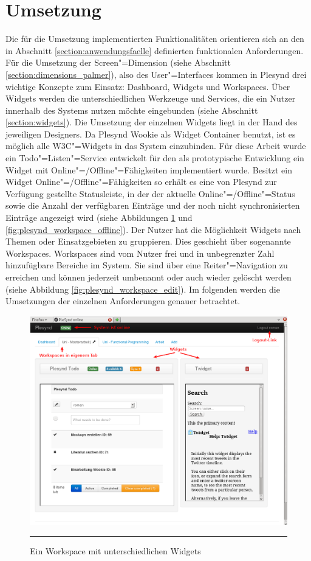 \section{Umsetzung}\label{section:umsetzung}
Die für die Umsetzung implementierten Funktionalitäten orientieren sich an den in Abschnitt \ref{section:anwendungsfaelle} definierten funktionalen Anforderungen. Für die Umsetzung der Screen"=Dimension (siehe Abschnitt \ref{section:dimensions_palmer}), also des User"=Interfaces kommen in Plesynd drei wichtige Konzepte zum Einsatz: Dashboard, Widgets und Workspaces. Über Widgets werden die unterschiedlichen Werkzeuge und Services, die ein Nutzer innerhalb des Systems nutzen möchte eingebunden (siehe Abschnitt \ref{section:widgets}). Die Umsetzung der einzelnen Widgets liegt in der Hand des jeweiligen Designers. Da Plesynd Wookie als Widget Container benutzt, ist es möglich alle W3C"=Widgets in das System einzubinden. Für diese Arbeit wurde ein Todo"=Listen"=Service entwickelt für den als prototypische Entwicklung ein Widget mit Online"=/Offline"=Fähigkeiten implementiert wurde. Besitzt ein Widget Online"=/Offline"=Fähigkeiten so erhält es eine von Plesynd zur Verfügung gestellte Statusleiste, in der der aktuelle Online"=/Offline"=Status sowie die Anzahl der verfügbaren Einträge und der noch nicht synchronisierten Einträge angezeigt wird (siehe Abbildungen \ref{fig:plesynd_workspace_online} und \ref{fig:plesynd_workspace_offline}). Der Nutzer hat die Möglichkeit Widgets nach Themen oder Einsatzgebieten zu gruppieren. Dies geschieht über sogenannte Workspaces. Workspaces sind vom Nutzer frei und in unbegrenzter Zahl hinzufügbare Bereiche im System. Sie sind über eine Reiter"=Navigation zu erreichen und können jederzeit umbenannt oder auch wieder gelöscht werden (siehe Abbildung \ref{fig:plesynd_workspace_edit}). Im folgenden werden die Umsetzungen der einzelnen Anforderungen genauer betrachtet.
\begin{figure}[H]
  \centering
  \includegraphics[width=\textwidth]{./Figures/plesynd_workspace_online.png}
    \rule{35em}{0.5pt}
  \caption[Plesynd User"=Interface: Workspace Online]{Ein Workspace mit unterschiedlichen Widgets}
  \label{fig:plesynd_workspace_online}
\end{figure}

